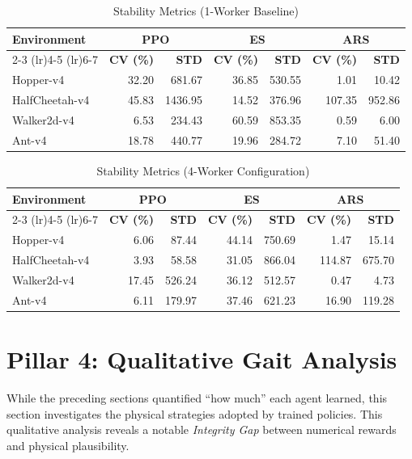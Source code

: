 \begin{table}[htbp]
\centering
\caption{Stability Metrics (1-Worker Baseline)}
\label{tab:1w_stability}
\begin{tabular}{@{}lrrrrrr@{}}
\toprule
\textbf{Environment} & \multicolumn{2}{c}{\textbf{PPO}} & \multicolumn{2}{c}{\textbf{ES}} & \multicolumn{2}{c}{\textbf{ARS}} \\
\cmidrule(lr){2-3} \cmidrule(lr){4-5} \cmidrule(lr){6-7}
 & \textbf{CV (\%)} & \textbf{STD} & \textbf{CV (\%)} & \textbf{STD} & \textbf{CV (\%)} & \textbf{STD} \\ \midrule
Hopper-v4 & 32.20 & 681.67 & 36.85 & 530.55 & 1.01 & 10.42 \\
HalfCheetah-v4 & 45.83 & 1436.95 & 14.52 & 376.96 & 107.35 & 952.86 \\
Walker2d-v4 & 6.53 & 234.43 & 60.59 & 853.35 & 0.59 & 6.00 \\
Ant-v4 & 18.78 & 440.77 & 19.96 & 284.72 & 7.10 & 51.40 \\ \bottomrule
\end{tabular}
\end{table}

\begin{table}[htbp]
\centering
\caption{Stability Metrics (4-Worker Configuration)}
\label{tab:4w_stability}
\begin{tabular}{@{}lrrrrrr@{}}
\toprule
\textbf{Environment} & \multicolumn{2}{c}{\textbf{PPO}} & \multicolumn{2}{c}{\textbf{ES}} & \multicolumn{2}{c}{\textbf{ARS}} \\
\cmidrule(lr){2-3} \cmidrule(lr){4-5} \cmidrule(lr){6-7}
 & \textbf{CV (\%)} & \textbf{STD} & \textbf{CV (\%)} & \textbf{STD} & \textbf{CV (\%)} & \textbf{STD} \\ \midrule
Hopper-v4 & 6.06 & 87.44 & 44.14 & 750.69 & 1.47 & 15.14 \\
HalfCheetah-v4 & 3.93 & 58.58 & 31.05 & 866.04 & 114.87 & 675.70 \\
Walker2d-v4 & 17.45 & 526.24 & 36.12 & 512.57 & 0.47 & 4.73 \\
Ant-v4 & 6.11 & 179.97 & 37.46 & 621.23 & 16.90 & 119.28 \\ \bottomrule
\end{tabular}
\end{table}

\section{Pillar 4: Qualitative Gait Analysis}
While the preceding sections quantified ``how much'' each agent learned, this section investigates the physical strategies adopted by trained policies. This qualitative analysis reveals a notable \textit{Integrity Gap} between numerical rewards and physical plausibility.

